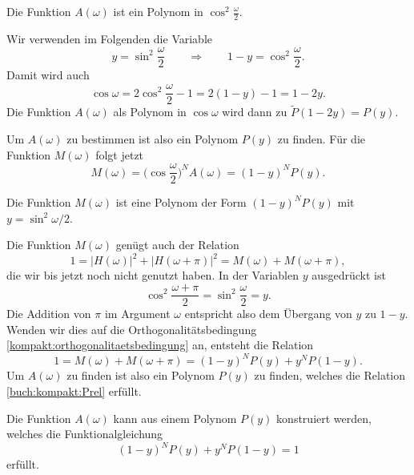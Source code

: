 \begin{konsequenz}
Die Funktion $A(\omega)$ ist ein Polynom in $\cos^2\frac{\omega}2$.
\end{konsequenz}

Wir verwenden im Folgenden die Variable 
\[
y=\sin^2\frac{\omega}2
\qquad\Rightarrow\qquad
1-y=\cos^2\frac{\omega}2.
\]
Damit wird auch 
\[
\cos\omega
=
2\cos^2\frac{\omega}2
-1
=
2(1-y)-1
=
1-2y.
\]
Die Funktion $A(\omega)$ als Polynom in $\cos\omega$ wird
dann zu $\tilde{P}(1-2y) = P(y)$.

Um $A(\omega)$ zu bestimmen ist also ein Polynom $P(y)$ zu finden.
Für die Funktion $M(\omega)$ folgt jetzt
\[
M(\omega)
=
\biggl(\cos\frac{\omega}2\biggr)^N
A(\omega)
=
(1-y)^N P(y).
\]

\begin{konsequenz}
Die Funktion $M(\omega)$ ist eine Polynom der Form
$(1-y)^NP(y)$ mit $y=\sin^2\omega/2$.
\end{konsequenz}

Die Funktion $M(\omega)$ genügt auch der Relation
\begin{equation}
1
=
|H(\omega)|^2 + |H(\omega+\pi)|^2
=
M(\omega) + M(\omega+\pi),
\label{kompakt:orthogonalitaetsbedingung}
\end{equation}
die wir bis jetzt noch nicht genutzt haben.
In der Variablen $y$ ausgedrückt ist
\[
\cos^2\frac{\omega+\pi}2
=
\sin^2\frac{\omega}2
=
y.
\]
Die Addition von $\pi$ im Argument $\omega$ entspricht also dem
Übergang von $y$ zu $1-y$.
Wenden wir dies auf die Orthogonalitätsbedingung
\eqref{kompakt:orthogonalitaetsbedingung} an, entsteht die Relation
\begin{equation}
1
=
M(\omega) + M(\omega+\pi)
=
(1-y)^N P(y) + y^N P(1-y).
\end{equation}
Um $A(\omega)$ zu finden ist also ein Polynom
$P(y)$ zu finden, welches die Relation
\eqref{buch:kompakt:Prel} erfüllt.

\begin{konsequenz}
Die Funktion $A(\omega)$ kann aus einem Polynom $P(y)$ konstruiert werden,
welches die Funktionalgleichung
\begin{equation}
(1-y)^N P(y) + y^N P(1-y) = 1
\label{buch:kompakt:Prel}
\end{equation}
erfüllt.
\end{konsequenz}

